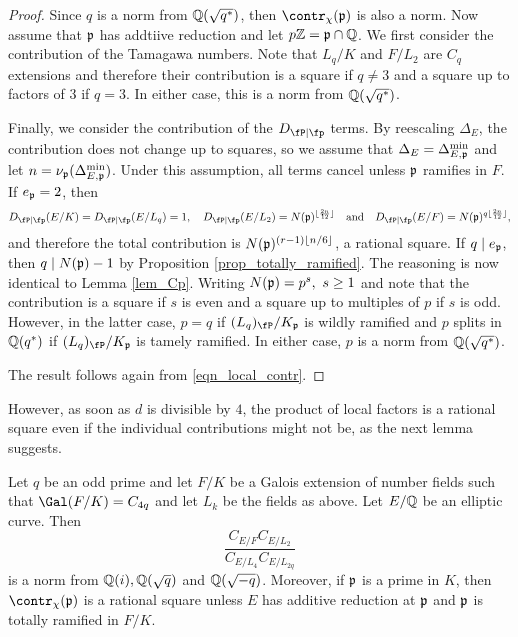 \begin{proof}
    Since $q$ is a norm from $\mathbb{Q}(\sqrt{q^*})$, then $\contr_\chi(\pp)$ is also a norm. Now assume that $\mathfrak{p}$ has addtiive reduction and let $p\mathbb{Z}=\mathfrak{p}\cap\mathbb{Q}$. We first consider the contribution of the Tamagawa numbers. Note that $L_q/K$ and $F/L_2$ are $C_q$ extensions and therefore their contribution is a square if $q\neq 3$ and a square up to factors of $3$ if $q=3$. In either case, this is a norm from $\mathbb{Q}(\sqrt{q^*})$.

    Finally, we consider the contribution of the $D_{\fP\mid\fp}$ terms. By reescaling $\Delta_E$, the contribution does not change up to squares, so we assume that $\Delta_E=\Delta_{E,\mathfrak{p}}^{\min}$ and let $n=\nu_{\mathfrak{p}}(\Delta_{E,\mathfrak{p}}^{\min})$. Under this assumption, all terms cancel unless $\mathfrak{p}$ ramifies in $F$. If $e_{\mathfrak{p}}=2$, then 
    \begin{equation}\label{eqn_ep=2}
        D_{\fP\mid\fp}(E/K)=D_{\fP\mid\fp}(E/L_q)=1,\quad D_{\fP\mid\fp}(E/L_2)=N(\pp)^{\floor{\frac{2n}{12}}}\quad\text{and}\quad D_{\fP\mid\fp}(E/F)=N(\pp)^{q\floor{\frac{2n}{12}}},
    \end{equation}
    and therefore the total contribution is $N(\mathfrak{p})^{(r-1)\lfloor n/6\rfloor}$, a rational square. If $q\mid e_{\mathfrak{p}}$, then $q\mid N(\mathfrak{p})-1$ by Proposition \ref{prop_totally_ramified}. The reasoning is now identical to Lemma \ref{lem_Cp}. Writing $N(\mathfrak{p})=p^s,\ s\geq1$ and note that the contribution is a square if $s$ is even and a square up to multiples of $p$ if $s$ is odd. However, in the latter case, $p=q$ if $(L_q)_\fP/K_\pp$ is wildly ramified and $p$ splits in $\mathbb{Q}(q^*)$ if $(L_q)_\fP/K_\pp$ is tamely ramified. In either case, $p$ is a norm from $\mathbb{Q}(\sqrt{q^*})$.   

    The result follows again from \eqref{eqn_local_contr}.

\end{proof}

However, as soon as $d$ is divisible by $4$, the product of local factors is a rational square even if the individual contributions might not be, as the next lemma suggests. 

\begin{lemma}\label{lem_C4p}
    Let $q$ be an odd prime and let $F/K$ be a Galois extension of number fields such that $\Gal(F/K)=C_{4q}$ and let $L_k$ be the fields as above. Let $E/\mathbb{Q}$ be an elliptic curve. Then
    $$\frac{C_{E/F}C_{E/L_2}}{C_{E/L_4}C_{E/L_{2q}}}$$
    is a norm from $\mathbb{Q}(i),\mathbb{Q}(\sqrt{q})$ and $\mathbb{Q}(\sqrt{-q})$. Moreover, if $\mathfrak{p}$ is a prime in $K$, then $\contr_\chi(\pp)$ is a rational square unless $E$ has additive reduction at $\mathfrak{p}$ and $\mathfrak{p}$ is totally ramified in $F/K$.
\end{lemma}


